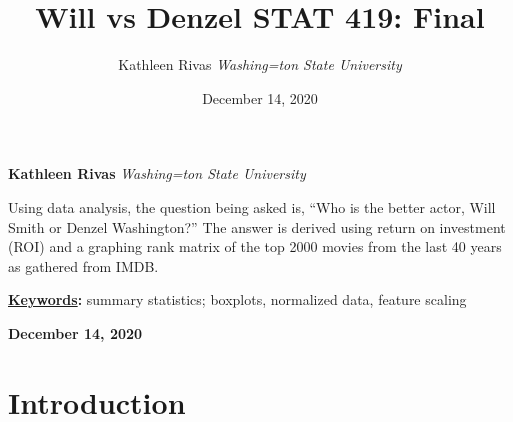 \documentclass[]{article}
\title{\textbf{\textcolor{WSU.crimson}{Will vs Denzel}} \newline \textbf{\textcolor{WSU.gray}{STAT 419: Final}}  }
\author{\Large Kathleen Rivas\vspace{0.05in} \newline\normalsize\emph{Washing=ton State University}  }
\date{December 14, 2020}
\newcommand*{\authorfont}{\fontfamily{phv}\selectfont}
\renewenvironment{abstract}
{{%
  \setlength{\leftmargin}{0mm}
  \setlength{\rightmargin}{\leftmargin}%
}%
  \relax}
{\endlist}
\begin{document}
	
%

{%
\setlength{\parindent}{0pt}
\thispagestyle{plain}
{\fontsize{18}{20}\selectfont\raggedright 
\maketitle  %

}

{
   \vskip 13.5pt\relax \normalsize\fontsize{11}{12} 
   
\textbf{\authorfont Kathleen Rivas} \hskip 15pt \emph{\small Washing=ton State University}   

}

}








\begin{abstract}

    \hbox{\vrule height .2pt width 39.14pc}

    \vskip 8.5pt %

\noindent Using data analysis, the question being asked is, ``Who is the better
actor, Will Smith or Denzel Washington?'' The answer is derived using
return on investment (ROI) and a graphing rank matrix of the top 2000
movies from the last 40 years as gathered from IMDB.


\vskip 8.5pt \noindent \textbf{\underline{Keywords}:} summary statistics; boxplots, normalized data, feature scaling \par

    




    
    \hbox{\vrule height .2pt width 39.14pc}
    \vskip 5pt 
    \hfill \textbf{\textcolor{WSU.gray}{ December 14, 2020 } }
    \vskip 5pt 
    
\end{abstract}


\vskip -8.5pt




\noindent  

\section{Introduction}
\label{sec:intro}
\end{document}
